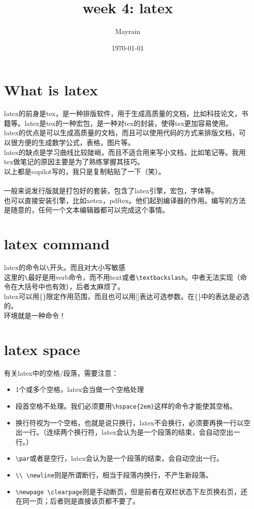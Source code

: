 \documentclass{article}
\title{week 4: latex}
\author{Mayrain}
\date{\today}
\begin{document}
\maketitle
\section{What is latex}
\noindent
latex的前身是tex，是一种排版软件，用于生成高质量的文档，比如科技论文，书籍等。latex是tex的一种宏包，是一种对tex的封装，使得tex更加容易使用。\\
latex的优点是可以生成高质量的文档，而且可以使用代码的方式来排版文档，可以很方便的生成数学公式，表格，图片等。\\
latex的缺点是学习曲线比较陡峭，而且不适合用来写小文档，比如笔记等。我用tex做笔记的原因主要是为了熟练掌握其技巧。\\
以上都是copilot写的，我只是复制粘贴了一下（笑）。\\
\\
一般来说发行版就是打包好的套装，包含了latex引擎，宏包，字体等。\\
也可以直接安装引擎，比如xetex，pdftex。他们起到编译器的作用。编写的方法是随意的，任何一个文本编辑器都可以完成这个事情。\\
\section{latex command}
\noindent
latex的命令以\verb|\|开头。而且对大小写敏感\\
这里的\verb|\|最好是用verb命令，而不用text或者\verb|\textbackslash|。中者无法实现（命令在大括号中也有效），后者太麻烦了。\\
latex可以用\{\}限定作用范围，而且也可以用[]表达可选参数。在\{\}中的表达是必选的。\\
环境就是一种命令！\\
\section{latex space}
\noindent
有关latex中的空格/段落，需要注意：\\
\begin{itemize}
    \item 1个或多个空格，latex会当做一个空格处理
    \item 段首空格不处理。我们必须要用\verb|\hspace{2em}|这样的命令才能使其空格。
    \item 换行符视为一个空格，也就是说只换行，latex不会换行，必须要再换一行以空出一行。（连续两个换行符，latex会认为是一个段落的结束，会自动空出一行。）
    \item \verb|\par|或者是空行，latex会认为是一个段落的结束，会自动空出一行。
    \item \verb|\\ \newline|则是所谓断行，相当于段落内换行，不产生新段落。
    \item \verb|\newpage \clearpage|则是手动断页，但是前者在双栏状态下左页换右页，还在同一页；后者则是直接该页都不要了。
\end{itemize}
\end{document}
